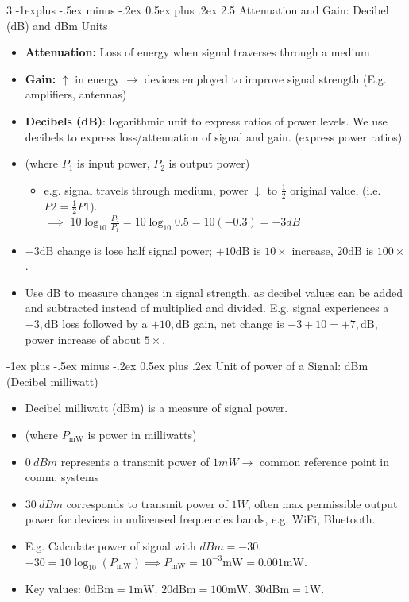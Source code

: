 \documentclass[a4paper, 9pt, landscape]{extarticle}
\makeatletter
\renewcommand{\subsection}{\@startsection{subsection}{2}{0mm}%
                                {-1explus -.5ex minus -.2ex}%
                                {0.5ex plus .2ex}%
                                {\normalfont\normalsize\bfseries}}
\renewcommand{\subsubsection}{\@startsection{paragraph}{4}{0mm}%
                                {-1ex plus -.5ex minus -.2ex}%
                                {0.5ex plus .2ex}%
                                {\normalfont\footnotesize\bfseries}}
\makeatother
\begin{document}
\begin{multicols*}{3}
\subsection{2.5 Attenuation and Gain: Decibel (dB) and dBm Units}
\begin{itemize}
  \item \textbf{Attenuation:} Loss of energy when signal traverses through a medium
  \item \textbf{Gain:} $\uparrow$ in energy $\rightarrow$ devices employed to improve signal strength (E.g. amplifiers, antennas)
  \item \textbf{Decibels (dB)}: logarithmic unit to express ratios of power levels. We use decibels to express loss/attenuation of signal and gain. (express power ratios)
  \item {} (where $P_1$ is input power, $P_2$ is output power)
  \begin{itemize}
    \item e.g. signal travels through medium, power $\downarrow$ to $\frac{1}{2}$ original value, (i.e. $P2 = \frac{1}{2} P1$).\\ $\implies$ $10\log_{10}\frac{P_2}{P_1} = 10\log_{10}0.5 = 10(-0.3) = -3dB$
  \end{itemize}
  \item $-3\text{dB}$ change is lose half signal power; $+10\text{dB}$ is $10\times$ increase, $20\text{dB}$ is $100\times$.
  \item Use dB to measure changes in signal strength, as decibel values can be added and subtracted instead of multiplied and divided. E.g. signal experiences a $-3,\text{dB}$ loss followed by a $+10,\text{dB}$ gain, net change is $-3 + 10 = +7,\text{dB}$, power increase of about $5\times$.
\end{itemize}

\subsubsection{Unit of power of a Signal: dBm (Decibel milliwatt)}
\begin{itemize}
  \item Decibel milliwatt (dBm) is a measure of signal power.
  \item {} (where $P_{\text{mW}}$ is power in milliwatts)
  \item $0 \ dBm$ represents a transmit power of $1 mW \rightarrow$ common reference point in comm. systems
  \item $30 \ dBm$ corresponds to transmit power of $1 W$, often max permissible output power for devices in unlicensed frequencies bands, e.g. WiFi, Bluetooth.
  \item E.g. Calculate power of signal with $dBm = -30$. \\
    $-30 = 10 \log_{10}(P_{\text{mW}}) \implies P_{\text{mW}} = 10^{-3}\text{mW} = 0.001 \text{mW}$.
  \item Key values: $0\text{dBm} = 1\text{mW}$. $20\text{dBm} = 100\text{mW}$. $30\text{dBm} = 1\text{W}$.


\end{itemize}
\end{multicols*}
\end{document}
